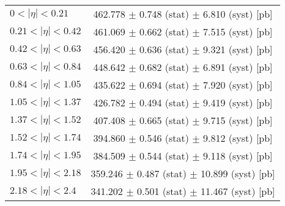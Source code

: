 \begin{tabular}{lc}
\hline
$0 < |\eta| <0.21$             & 462.778 $\pm$ 0.748 (stat) $\pm$ 6.810 (syst) [pb]  \\
$0.21 < |\eta| <0.42$          & 461.069 $\pm$ 0.662 (stat) $\pm$ 7.515 (syst) [pb]  \\
$0.42 < |\eta| <0.63$          & 456.420 $\pm$ 0.636 (stat) $\pm$ 9.321 (syst) [pb]  \\
$0.63 < |\eta| <0.84$          & 448.642 $\pm$ 0.682 (stat) $\pm$ 6.891 (syst) [pb]  \\
$0.84 < |\eta| <1.05$          & 435.622 $\pm$ 0.694 (stat) $\pm$ 7.920 (syst) [pb]  \\
$1.05 < |\eta| <1.37$          & 426.782 $\pm$ 0.494 (stat) $\pm$ 9.419 (syst) [pb]  \\
$1.37 < |\eta| <1.52$          & 407.408 $\pm$ 0.665 (stat) $\pm$ 9.715 (syst) [pb]  \\
$1.52 < |\eta| <1.74$          & 394.860 $\pm$ 0.546 (stat) $\pm$ 9.812 (syst) [pb]  \\
$1.74 < |\eta| <1.95$          & 384.509 $\pm$ 0.544 (stat) $\pm$ 9.118 (syst) [pb]  \\
$1.95 < |\eta| <2.18$          & 359.246 $\pm$ 0.487 (stat) $\pm$ 10.899 (syst) [pb]  \\
$2.18 < |\eta| <2.4$           & 341.202 $\pm$ 0.501 (stat) $\pm$ 11.467 (syst) [pb]  \\
\hline
\end{tabular}
